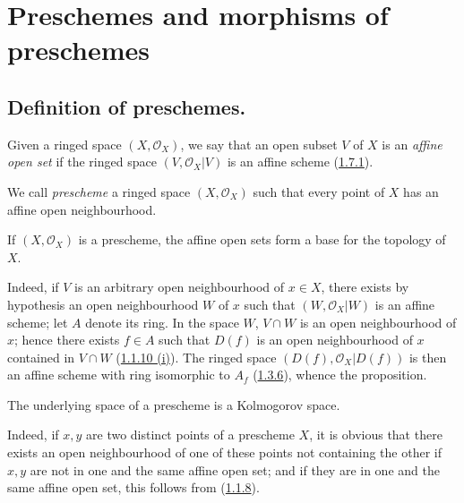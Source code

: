 \section{Preschemes and morphisms of preschemes}
\label{section:I.2}

\subsection{Definition of preschemes.}
\label{subsection:I.2.1}

\begin{env}[2.1.1]
\label{I.2.1.1}
Given a ringed space $(X,\mathscr{O}_X)$, we say that an open subset
$V$ of $X$ is an \emph{affine open set} if the ringed space
$(V,\mathscr{O}_X|V)$ is an affine scheme
(\hyperref[I.1.7.1]{1.7.1}).
\end{env}

\begin{definition}[2.1.2]
\label{I.2.1.2}
We call \emph{prescheme} a ringed space $(X,\mathscr{O}_X)$ such that every
point of $X$ has an affine open neighbourhood.
\end{definition}


\begin{proposition}[2.1.3]
\label{I.2.1.3}
If $(X,\mathscr{O}_X)$ is a prescheme, the affine open sets form a base for
the topology of $X$.
\end{proposition}

Indeed, if $V$ is an arbitrary open neighbourhood of $x\in X$, there exists
by hypothesis an open neighbourhood $W$ of $x$ such that
$(W,\mathscr{O}_X|W)$ is an affine scheme; let $A$ denote its ring.
In the space $W$, $V\cap W$ is an open neighbourhood of $x$; hence there
exists $f\in A$ such that $D(f)$ is an open neighbourhood of $x$ contained in
$V\cap W$ (\hyperref[I.1.1.10]{1.1.10 (i)}). The ringed space
$(D(f),\mathscr{O}_X|D(f))$ is then an affine scheme with ring isomorphic to
$A_f$ (\hyperref[I.1.3.6]{1.3.6}), whence the proposition.

\begin{proposition}[2.1.4]
\label{I.2.1.4}
The underlying space of a prescheme is a Kolmogorov space.
\end{proposition}

Indeed, if $x,y$ are two distinct points of a prescheme $X$, it is
obvious that there exists an open neighbourhood of one of these points not
containing the other if $x,y$ are not in one and the same affine open set;
and if they are in one and the same affine open set, this follows from
(\hyperref[I.1.1.8]{1.1.8}).

